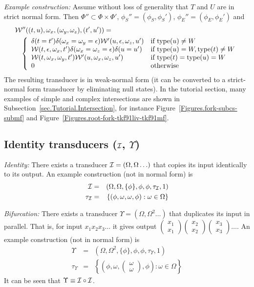 \documentclass{article}
\newcommand{\secref}[1]{Subsection~\ref{sec.#1}}
\newcommand{\seclabel}[1]{\label{sec.#1}}
\newcommand{\figref}[1]{Figure~\ref{Figures.#1}}
\newcommand\transequiv{\equiv}
\newcommand\identity{{\cal I}}
\newcommand\fork{\circ}
\newcommand\idfork{\Upsilon}
\newcommand\States{\Phi}
\newcommand\Transitions{\tau}
\newcommand\transitionsof[1]{\Transitions_{#1}}
\newcommand\startstate{\phi_S}
\newcommand\laststate{\phi_E}
\newcommand\weight{{\cal W}}
\newcommand\statetype{\mbox{type}}
\newcommand\dup[1]{\left( \begin{array}{l} #1 \\ #1 \end{array} \right)}
\begin{document}
{\em Example construction:}
Assume without loss of generality that $T$ and $U$ are in strict normal form.
Then $\States'' \subset \States \times \States'$,
$\startstate''=(\startstate,\startstate')$, $\laststate''=(\laststate,\laststate')$
and
\begin{eqnarray*}
\lefteqn{\weight''((t,u),\omega_x,(\omega_y,\omega_z),(t',u')) =} & & \\
 & & \left\{ \begin{array}{ll}
\delta(t=t') \delta(\omega_x=\omega_y=\epsilon) \weight'(u,\epsilon,\omega_z,u') & \mbox{if $\statetype(u) \neq W$} \\
\weight(t,\epsilon,\omega_x,t') \delta(\omega_x=\omega_z=\epsilon) \delta(u=u') & \mbox{if $\statetype(u) = W,\statetype(t) \neq W$} \\
\weight(t,\omega_x,\omega_y,t') \weight'(u,\omega_x,\omega_z,u') & \mbox{if $\statetype(t) = \statetype(u) = W$} \\
0 & \mbox{otherwise}
\end{array} \right.
\end{eqnarray*}
The resulting transducer is in weak-normal form (it can be converted to a strict-normal form transducer by eliminating null states).
In the tutorial section, many examples of simple and complex intersections are shown in \secref{Tutorial.Intersection}, for instance \figref{fork-subcs-submf} and  \figref{root-fork-tkf91liv-tkf91mf}. 



\subsection{Identity transducers ($\identity$, $\idfork$)}
\seclabel{Identity}

{\em Identity:}
There exists a transducer $\identity=(\Omega,\Omega\ldots)$ that copies its input identically to its output.
An example construction (not in normal form) is
\begin{eqnarray*}
\identity & = & (\Omega,\Omega,\{\phi\},\phi,\phi,\transitionsof{\identity},1) \\
\transitionsof{\identity} & = & \left\{(\phi,\omega,\omega,\phi):\omega\in\Omega\right\}
\end{eqnarray*}

{\em Bifurcation:}
There exists a transducer $\idfork=(\Omega,\Omega^2\ldots)$ that duplicates its input in parallel.
That is, for input $x_1 x_2 x_3 \ldots$ it gives output $\dup{x_1}\dup{x_2}\dup{x_3}\ldots$.
An example construction (not in normal form) is
\begin{eqnarray*}
\idfork & = & (\Omega,\Omega^2,\{\phi\},\phi,\phi,\transitionsof{\idfork},1) \\
\transitionsof{\idfork} & = & \left\{\left(\phi,\omega,\dup{\omega},\phi\right):\omega\in\Omega\right\}
\end{eqnarray*}
It can be seen that $\idfork \transequiv \identity \fork \identity$.
\end{document}
